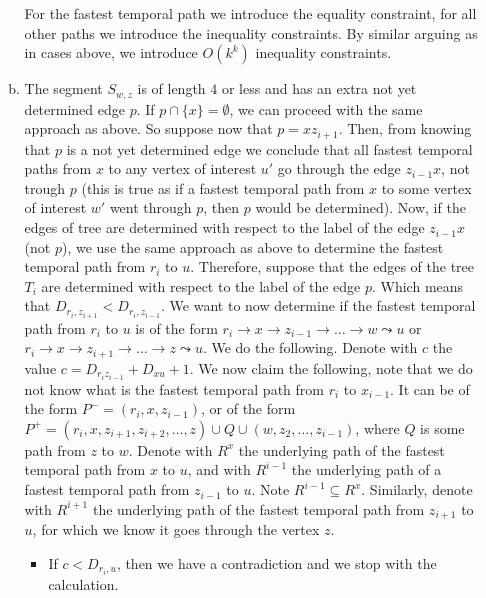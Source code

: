 \documentclass[a4paper,UKenglish,cleveref, autoref, thm-restate, anonymous]{lipics-v2021}
\begin{document}
\begin{enumerate}[(i)]
\begin{enumerate}[(a)]
        For the fastest temporal path we introduce the equality constraint, 
        for all other paths we introduce the inequality constraints.
        By similar arguing as in cases above, we introduce $O(k^k)$ inequality constraints.
        \item The segment $S_{w,z}$ is of length $4$ or less
        and has an extra not yet determined edge $p$. 
        If $p \cap \{x\} = \emptyset$, 
        we can proceed with the same approach as above.
        So suppose now that $p = x z_{i+1}$.  
        Then, from knowing that $p$ is a not yet determined edge we conclude that
        all fastest temporal paths from $x$ to any vertex of interest $u'$ go through the edge $z_{i-1}x$, not trough $p$ 
        (this is true as if a fastest temporal path from $x$ to some vertex of interest $w'$ went through $p$, then $p$ would be determined).
        Now, if the edges of tree are determined with respect to the label of the edge $z_{i-1}x$ (not $p$),
        we use the same approach as above to determine the fastest temporal path from $r_i$ to $u$.
        Therefore, suppose that the edges of the tree $T_i$ are determined with respect to the label of the edge $p$.
        Which means that $D_{r_i, z_{i+1}} < D_{r_i, z_{i-1}}$.
        We want to now determine if the fastest temporal path from $r_i$ to $u$ is of the form 
        $r_i \rightarrow x \rightarrow z_{i-1} \rightarrow \dots \rightarrow w \leadsto u$ or
        $r_i \rightarrow x \rightarrow z_{i+1} \rightarrow \dots \rightarrow z \leadsto u$.
        We do the following.
        Denote with $c$ the value $c = D_{r_i z_{i-1}} + D_{x u} + 1$.
        We now claim the following, note that we do not know what is the fastest temporal path from $r_i$ to $x_{i-1}$. 
        It can be of the form $P^- = (r_i,x,z_{i-1})$,
        or of the form $P^+ = (r_i,x, z_{i+1}, z_{i+2}, \dots, z) \cup Q \cup (w, z_2, \dots, z_{i-1})$, where $Q$ is some path from $z$ to $w$.
        Denote with $R^x$ the underlying path of the fastest temporal path from $x$ to $u$,
        and with $R^{i-1}$ the underlying path of a fastest temporal path from $z_{i-1}$ to $u$.
        Note $R^{i-1} \subseteq R^x$.
        Similarly,
        denote with $R^{i+1}$ the underlying path of the fastest temporal path from $z_{i+1}$ to $u$, 
        for which we know it goes through the vertex $z$.
        \begin{itemize}
            \item  If $c < D_{r_i,u}$, then we have a contradiction and we stop with the calculation.\\

\end{itemize}
\end{enumerate}
\end{enumerate}
\end{document}
